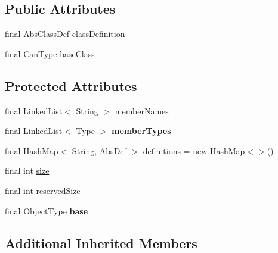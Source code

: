 \subsection*{Public Attributes}
\begin{DoxyCompactItemize}
\item 
final \hyperlink{classcompiler_1_1abstr_1_1tree_1_1def_1_1_abs_class_def}{Abs\+Class\+Def} \hyperlink{classcompiler_1_1seman_1_1type_1_1_object_type_a25f3915666a06189d55120506ce97a2e}{class\+Definition}
\item 
final \hyperlink{classcompiler_1_1seman_1_1type_1_1_can_type}{Can\+Type} \hyperlink{classcompiler_1_1seman_1_1type_1_1_object_type_a776328ea5119061ad683d36d7c8ff1ef}{base\+Class}
\end{DoxyCompactItemize}
\subsection*{Protected Attributes}
\begin{DoxyCompactItemize}
\item 
final Linked\+List$<$ String $>$ \hyperlink{classcompiler_1_1seman_1_1type_1_1_object_type_a588dff762d9597e8ccafbd8fb1309724}{member\+Names}
\item 
\mbox{\label{classcompiler_1_1seman_1_1type_1_1_object_type_acd9b097bda4632c2593aad2c2bd615fc}} 
final Linked\+List$<$ \hyperlink{classcompiler_1_1seman_1_1type_1_1_type}{Type} $>$ {\bfseries member\+Types}
\item 
final Hash\+Map$<$ String, \hyperlink{classcompiler_1_1abstr_1_1tree_1_1def_1_1_abs_def}{Abs\+Def} $>$ \hyperlink{classcompiler_1_1seman_1_1type_1_1_object_type_a5b2a66036d0998446fd33f46e95155fd}{definitions} = new Hash\+Map$<$$>$()
\item 
final int \hyperlink{classcompiler_1_1seman_1_1type_1_1_object_type_a4ad19055251d02b02789f40b2101267a}{size}
\item 
final int \hyperlink{classcompiler_1_1seman_1_1type_1_1_object_type_a0cb8b416f51705d73146b0b329593d94}{reserved\+Size}
\item 
\mbox{\label{classcompiler_1_1seman_1_1type_1_1_object_type_aeb44aa1f3c0db662360e6cc444d200ae}} 
final \hyperlink{classcompiler_1_1seman_1_1type_1_1_object_type}{Object\+Type} {\bfseries base}
\end{DoxyCompactItemize}
\subsection*{Additional Inherited Members}


